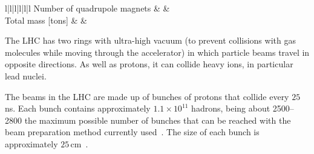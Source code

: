 \begin{table}[]
{\begin{tabular}{l|l|l|l|l|l}
 Number of quadrupole magnets                       			&       &                        		\\
 Total mass [tons] 			                      			&      &                        		\\
 \bottomrule
\end{tabular}%
}
\caption{Summary of main accelerator parameters for the LHC, showing the design values, and those used during Run 1, Run 2 
and Run 3, as well as the expected parameters for Run 4 at the HL-LHC~\cite{Bruning:782076, Boyd:2020qox, ZurbanoFernandez:2020cco}.}
\label{tab:Chap2:LHC:Parameters}
\end{table}






The LHC has two rings with ultra-high vacuum (to prevent collisions with gas molecules 
while moving through the accelerator) in which particle beams travel in opposite directions. 
As well as protons, it can collide heavy ions, in particular lead nuclei. 

The beams in the LHC are made up of bunches of protons that %
collide every $25\,$ns. 
Each bunch contains approximately $1.1 \times 10^{11}$  hadrons, being about 2500--2800 the maximum possible 
number of bunches that can be reached with the beam preparation method currently used~\cite{steerenberg2019operation}.
The size of each bunch is approximately $25\,$cm~\cite{Evans_2008}.


